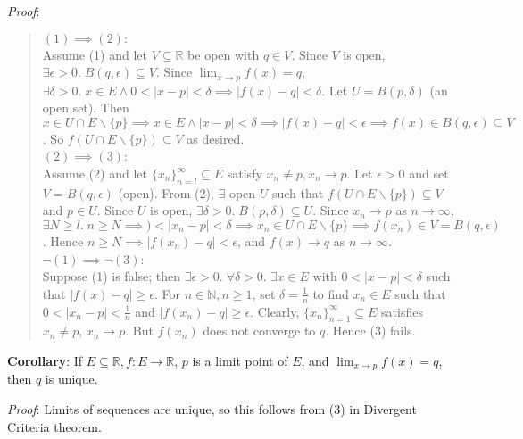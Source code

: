 \documentclass[11pt]{article}
\begin{document}
\emph{Proof}:
\begin{quote}\vspace{-0.3cm}
$(1) \implies (2):$\\
Assume (1) and let $V \subseteq \mathbb{R}$ be open with $q \in V$. Since $V$ is open, $\exists \epsilon > 0.\; B(q, \epsilon) \subseteq V$. Since $\lim_{x \to p} f(x)= q$, $\exists \delta > 0.\; x \in E \land 0 < |x-p| < \delta \implies |f(x) - q| < \delta$. Let $U = B(p, \delta)$ (an open set). Then $x \in U \cap E \backslash \{p\} \implies x \in E \land |x-p| < \delta \implies |f(x) - q| < \epsilon \implies f(x) \in B(q, \epsilon) \subseteq V$. So $f(U \cap E \backslash \{p\}) \subseteq V$ as desired.\\

$(2) \implies (3)$:\\
Assume (2) and let $\{x_n\}_{n=l}^\infty \subseteq E$ satisfy $x_n \neq p, x_n \to p$. Let $\epsilon > 0$ and set $V = B(q, \epsilon)$ (open). From (2), $\exists$ open $U$ such that $f(U \cap E \backslash \{p\}) \subseteq V$ and $p \in U$. Since $U$ is open, $\exists \delta > 0.\; B(p, \delta) \subseteq U$. Since $x_n \to p$ as $n \to \infty$, $\exists N \geq l.\; n \geq N \implies ) < |x_n - p| < \delta \implies x_n \in U \cap E \backslash \{p\} \implies f(x_n) \in V = B(q, \epsilon)$. Hence $n \geq N \implies |f(x_n) - q| < \epsilon$, and $f(x) \to q$ as $n \to \infty$.\\

$\neg (1) \implies \neg (3)$:\\
 Suppose (1) is false; then $\exists \epsilon > 0.\; \forall \delta > 0.\; \exists x \in E$ with $0 < |x-p| < \delta$ such that $|f(x) - q| \geq \epsilon$. For $n \in \mathbb{N}, n \geq 1$, set $\delta = \frac{1}{n}$ to find $x_n \in E$ such that $0 < |x_n - p| < \frac{1}{n}$ and $|f(x_n) - q| \geq \epsilon$. Clearly, $\{x_n\}_{n=1}^\infty \subseteq E$ satisfies $x_n \neq p$, $x_n \to p$. But $f(x_n)$ does not converge to $q$. Hence (3) fails.
\end{quote}

\textbf{Corollary}: If $E \subseteq \mathbb{R}, f : E \to \mathbb{R}$, $p$ is a limit point of $E$, and $\lim_{x \to p} f(x) = q$, then $q$ is unique.

\emph{Proof}: Limits of sequences are unique, so this follows from (3) in Divergent Criteria theorem.\\
\end{document}
